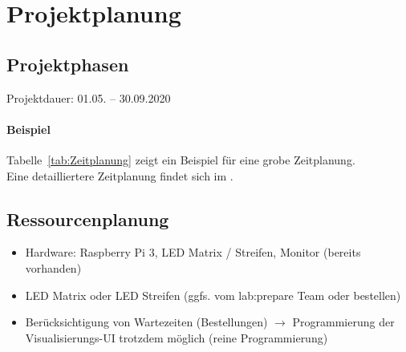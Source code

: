 \clearpage
\section{Projektplanung} 
\label{sec:Projektplanung}


\subsection{Projektphasen}
\label{sec:Projektphasen}
Projektdauer: 01.05. -- 30.09.2020
%

\paragraph{Beispiel}
Tabelle~\ref{tab:Zeitplanung} zeigt ein Beispiel für eine grobe Zeitplanung.
\\
Eine detailliertere Zeitplanung findet sich im .

%
%
%

\subsection{Ressourcenplanung}
\label{sec:Ressourcenplanung}

\begin{itemize}
	\item Hardware: Raspberry Pi 3, LED Matrix / Streifen, Monitor (bereits vorhanden)
	\item LED Matrix oder LED Streifen (ggfs. vom lab:prepare Team oder bestellen)
	\item Ber\"ucksichtigung von Wartezeiten (Bestellungen) $\rightarrow$ Programmierung der Visualisierungs-UI trotzdem m\"oglich (reine Programmierung)
\end{itemize}


